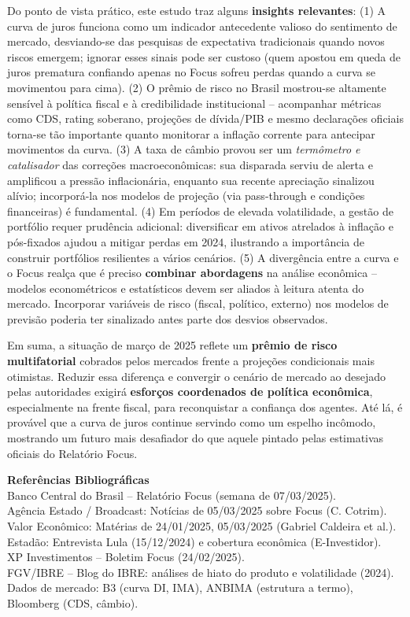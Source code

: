 \documentclass[a4paper,12pt]{article}
\begin{document}
Do ponto de vista prático, este estudo traz alguns \textbf{insights relevantes}:
(1) A curva de juros funciona como um indicador antecedente valioso do sentimento de mercado, desviando-se das pesquisas de expectativa tradicionais quando novos riscos emergem; ignorar esses sinais pode ser custoso (quem apostou em queda de juros prematura confiando apenas no Focus sofreu perdas quando a curva se movimentou para cima). 
(2) O prêmio de risco no Brasil mostrou-se altamente sensível à política fiscal e à credibilidade institucional -- acompanhar métricas como CDS, rating soberano, projeções de dívida/PIB e mesmo declarações oficiais torna-se tão importante quanto monitorar a inflação corrente para antecipar movimentos da curva.
(3) A taxa de câmbio provou ser um \textit{termômetro e catalisador} das correções macroeconômicas: sua disparada serviu de alerta e amplificou a pressão inflacionária, enquanto sua recente apreciação sinalizou alívio; incorporá-la nos modelos de projeção (via pass-through e condições financeiras) é fundamental.
(4) Em períodos de elevada volatilidade, a gestão de portfólio requer prudência adicional: diversificar em ativos atrelados à inflação e pós-fixados ajudou a mitigar perdas em 2024, ilustrando a importância de construir portfólios resilientes a vários cenários.
(5) A divergência entre a curva e o Focus realça que é preciso \textbf{combinar abordagens} na análise econômica -- modelos econométricos e estatísticos devem ser aliados à leitura atenta do mercado. Incorporar variáveis de risco (fiscal, político, externo) nos modelos de previsão poderia ter sinalizado antes parte dos desvios observados.

Em suma, a situação de março de 2025 reflete um \textbf{prêmio de risco multifatorial} cobrados pelos mercados frente a projeções condicionais mais otimistas. Reduzir essa diferença e convergir o cenário de mercado ao desejado pelas autoridades exigirá \textbf{esforços coordenados de política econômica}, especialmente na frente fiscal, para reconquistar a confiança dos agentes. Até lá, é provável que a curva de juros continue servindo como um espelho incômodo, mostrando um futuro mais desafiador do que aquele pintado pelas estimativas oficiais do Relatório Focus.

\vfill
\textbf{Referências Bibliográficas} \\
Banco Central do Brasil -- Relatório Focus (semana de 07/03/2025). \\
Agência Estado / Broadcast: Notícias de 05/03/2025 sobre Focus (C. Cotrim). \\
Valor Econômico: Matérias de 24/01/2025, 05/03/2025 (Gabriel Caldeira et al.). \\
Estadão: Entrevista Lula (15/12/2024) e cobertura econômica (E-Investidor). \\
XP Investimentos -- Boletim Focus (24/02/2025). \\
FGV/IBRE -- Blog do IBRE: análises de hiato do produto e volatilidade (2024). \\
Dados de mercado: B3 (curva DI, IMA), ANBIMA (estrutura a termo), Bloomberg (CDS, câmbio). \\
\end{document}
